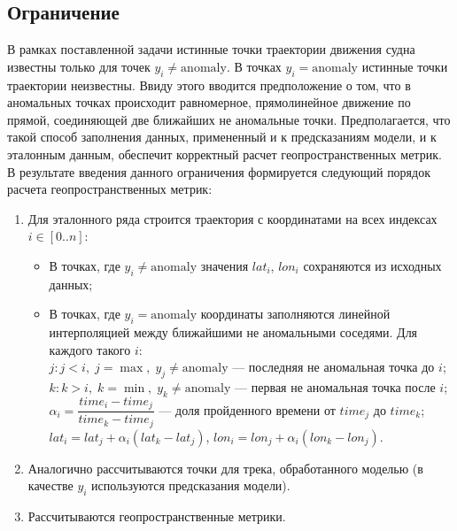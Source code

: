 \documentclass[a4paper,12pt]{report}
\begin{document}
	\subsection*{Ограничение}
	В рамках поставленной задачи истинные точки траектории движения судна известны только для точек $y_i \ne \mathrm{anomaly}$. В точках $y_i = \mathrm{anomaly}$ истинные точки траектории неизвестны. Ввиду этого вводится предположение о том, что в аномальных точках происходит равномерное, прямолинейное движение по прямой, соединяющей две ближайших не аномальные точки. Предполагается, что такой способ заполнения данных, примененный и к предсказаниям модели, и к эталонным данным, обеспечит корректный расчет геопространственных метрик. В результате введения данного ограничения формируется следующий порядок расчета геопространственных метрик:
	\begin{enumerate}
		\item Для эталонного ряда строится траектория с координатами на всех индексах $i \in [0..n]$:
			\begin{itemize}
				\item В точках, где $y_i \neq \mathrm{anomaly}$ значения $\mathit{lat}_i$, $\mathit{lon}_i$ сохраняются из исходных данных;
				\item В точках, где $y_i = \mathrm{anomaly}$ координаты заполняются линейной интерполяцией между ближайшими не аномальными соседями. Для каждого такого $i$:\\
				$j: j < i,\; j=\max,\; y_j \neq \mathrm{anomaly}$ --- последняя не аномальная точка до $i$;\\
				$k: k > i,\; k=\min,\; y_k \neq \mathrm{anomaly}$ --- первая не аномальная точка после $i$;\\
				$\alpha_i = \dfrac{time_i - time_j}{time_k - time_j}$ --- доля пройденного времени от $time_j$ до $time_k$;\\
				$\mathit{lat}_i = \mathit{lat}_j + \alpha_i(\mathit{lat}_k - \mathit{lat}_j)$, \quad $\mathit{lon}_i = \mathit{lon}_j + \alpha_i(\mathit{lon}_k - \mathit{lon}_j)$.
			\end{itemize}
		\item Аналогично рассчитываются точки для трека, обработанного моделью (в качестве $y_i$ используются предсказания модели).
		\item Рассчитываются геопространственные метрики.
	\end{enumerate}
\end{document}
